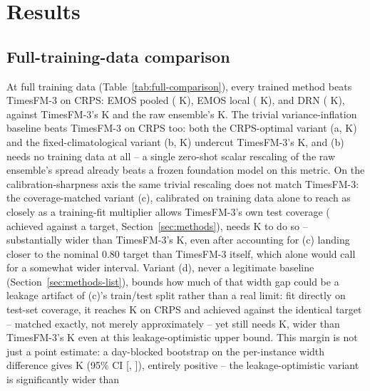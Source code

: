 \section{Results}
\label{sec:results}

\subsection{Full-training-data comparison}
\label{sec:results-full}



At full training data (Table~\ref{tab:full-comparison}), every trained
method beats TimesFM-3 on CRPS: EMOS pooled (\CrpsEmosPooledFull{} K),
EMOS local (\CrpsEmosLocalFull{} K), and DRN (\CrpsDrnFull{} K), against
TimesFM-3's \CrpsTsfmFull{} K and the raw ensemble's \CrpsRawFull{} K.
The trivial variance-inflation baseline beats TimesFM-3 on CRPS too: both
the CRPS-optimal variant (a, \CrpsInflAFull{} K) and the
fixed-climatological variant (b, \CrpsInflBFull{} K) undercut TimesFM-3's
\CrpsTsfmFull{} K, and (b) needs no training data at all -- a single
zero-shot scalar rescaling of the raw ensemble's spread already beats a
frozen foundation model on this metric. On the calibration-sharpness axis
the same trivial rescaling does not match TimesFM-3: the coverage-matched
variant (c), calibrated on training data alone to reach as closely as a
training-fit multiplier allows TimesFM-3's own test coverage
(\CoverageInflCFull{} achieved against a \CoverageTsfmFull{} target,
Section~\ref{sec:methods}), needs \WidthInflCFull{} K to do so --
substantially wider than TimesFM-3's \WidthTsfmFull{} K, even after
accounting for (c) landing closer to the nominal 0.80 target than
TimesFM-3 itself, which alone would call for a somewhat wider interval.
Variant (d), never a legitimate baseline (Section~\ref{sec:methods-list}),
bounds how much of that width gap could be a leakage artifact of (c)'s
train/test split rather than a real limit: fit directly on test-set
coverage, it reaches \InflLeakyCrps{} K on CRPS and
\InflLeakyCoverage{} achieved against the identical \CoverageTsfmFull{}
target -- matched exactly, not merely approximately -- yet still needs
\InflLeakyWidth{} K, wider than TimesFM-3's \WidthTsfmFull{} K even at
this leakage-optimistic upper bound. This margin is not just a point
estimate: a day-blocked bootstrap on the per-instance width difference
gives \InflLeakyWidthDiffPoint{} K (95\% CI
[\InflLeakyWidthDiffCiLow{}, \InflLeakyWidthDiffCiHigh{}]), entirely
positive -- the leakage-optimistic variant is significantly wider than
